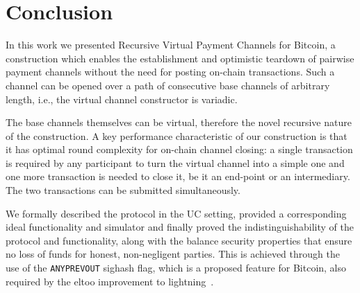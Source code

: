 \section{Conclusion}

  In this work we presented Recursive Virtual Payment Channels for Bitcoin, a
  construction which enables the establishment and optimistic teardown of
  pairwise payment channels without the need for posting on-chain transactions.
  Such a channel can be opened over a path of consecutive base channels of
  arbitrary length, i.e., the virtual channel constructor is variadic.

  The base channels themselves can be virtual, therefore the novel recursive
  nature of the construction. A key performance characteristic of our
  construction is that it has optimal round complexity for on-chain channel
  closing: a single transaction is required by any participant to turn the
  virtual channel into a simple one and one more transaction is needed to close
  it, be it an end-point or an intermediary. The two transactions can be
  submitted simultaneously.

  We formally described the protocol in the UC setting, provided a corresponding
  ideal functionality and simulator and finally proved the indistinguishability
  of the protocol and functionality, along with the balance security properties
  that ensure no loss of funds for honest, non-negligent parties. This is
  achieved through the use of the \texttt{ANYPREVOUT} sighash flag, which is a
  proposed feature for Bitcoin, also required by the eltoo improvement to
  lightning~\cite{eltoo}.

\newpage
\appendix
